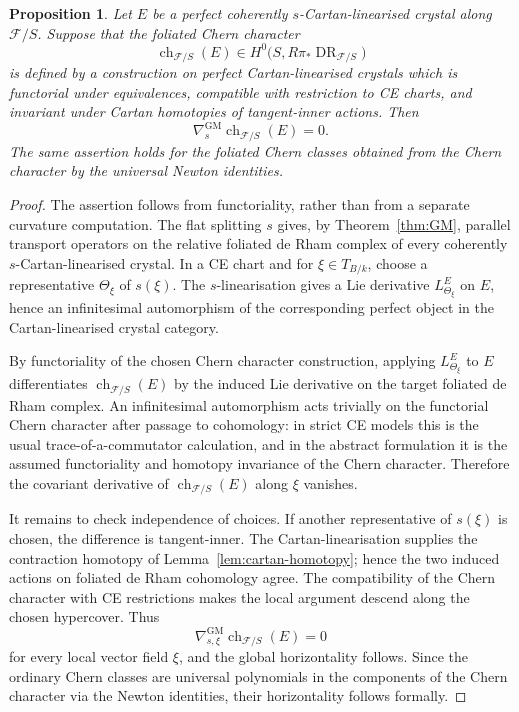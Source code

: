 \documentclass[11pt,reqno,a4paper,dvipsnames,x11names]{amsart}
\numberwithin{equation}{section}
\theoremstyle{plain}
\newtheorem{proposition}[theorem]{Proposition}
\theoremstyle{definition}
\theoremstyle{remark}
\DeclareMathOperator{\DR}{DR}
\newcommand{\kk}{k}
\newcommand{\cF}{\mathcal F}
\newcommand{\GM}{\mathrm{GM}}
\begin{document}
\begin{proposition}\label{prop:chern-horizontal}
Let \(E\) be a perfect coherently \(s\)-Cartan-linearised crystal along \(\cF/S\). Suppose that the foliated Chern character
\[
 \operatorname{ch}_{\cF/S}(E)
 \in
 H^0\bigl(S,R\pi_*\DR_{\cF/S}\bigr)
\]
is defined by a construction on perfect Cartan-linearised crystals which is functorial under equivalences, compatible with restriction to CE charts, and invariant under Cartan homotopies of tangent-inner actions. Then
\[
 \nabla^{\GM}_s\operatorname{ch}_{\cF/S}(E)=0.
\]
The same assertion holds for the foliated Chern classes obtained from the Chern character by the universal Newton identities.
\end{proposition}

\begin{proof}
The assertion follows from functoriality, rather than from a separate curvature computation. The flat splitting \(s\) gives, by Theorem~\ref{thm:GM}, parallel transport operators on the relative foliated de Rham complex of every coherently \(s\)-Cartan-linearised crystal. In a CE chart and for \(\xi\in T_{B/\kk}\), choose a representative \(\Theta_\xi\) of \(s(\xi)\). The \(s\)-linearisation gives a Lie derivative \(L^E_{\Theta_\xi}\) on \(E\), hence an infinitesimal automorphism of the corresponding perfect object in the Cartan-linearised crystal category.

By functoriality of the chosen Chern character construction, applying \(L^E_{\Theta_\xi}\) to \(E\) differentiates \(\operatorname{ch}_{\cF/S}(E)\) by the induced Lie derivative on the target foliated de Rham complex. An infinitesimal automorphism acts trivially on the functorial Chern character after passage to cohomology: in strict CE models this is the usual trace-of-a-commutator calculation, and in the abstract formulation it is the assumed functoriality and homotopy invariance of the Chern character. Therefore the covariant derivative of \(\operatorname{ch}_{\cF/S}(E)\) along \(\xi\) vanishes.

It remains to check independence of choices. If another representative of \(s(\xi)\) is chosen, the difference is tangent-inner. The Cartan-linearisation supplies the contraction homotopy of Lemma~\ref{lem:cartan-homotopy}; hence the two induced actions on foliated de Rham cohomology agree. The compatibility of the Chern character with CE restrictions makes the local argument descend along the chosen hypercover. Thus
\[
 \nabla^{\GM}_{s,\xi}\operatorname{ch}_{\cF/S}(E)=0
\]
for every local vector field \(\xi\), and the global horizontality follows. Since the ordinary Chern classes are universal polynomials in the components of the Chern character via the Newton identities, their horizontality follows formally.
\end{proof}
\end{document}
